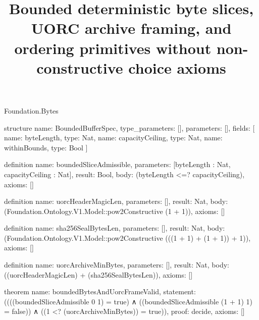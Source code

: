 \begin{lexlean}{Foundation.Bytes}
\title{Bounded deterministic byte slices, UORC archive framing, and ordering primitives without non-constructive choice axioms}

\begin{semanticmodule}

structure{
  name: BoundedBufferSpec,
  type_parameters: [],
  parameters: [],
  fields: [
    {name: byteLength, type: Nat},
    {name: capacityCeiling, type: Nat},
    {name: withinBounds, type: Bool}
  ]
}

definition{
  name: boundedSliceAdmissible,
  parameters: [byteLength : Nat, capacityCeiling : Nat],
  result: Bool,
  body: (byteLength <=? capacityCeiling),
  axioms: []
}

definition{
  name: uorcHeaderMagicLen,
  parameters: [],
  result: Nat,
  body: (Foundation.Ontology.V1.Model::pow2Constructive (1 + 1)),
  axioms: []
}

definition{
  name: sha256SealBytesLen,
  parameters: [],
  result: Nat,
  body: (Foundation.Ontology.V1.Model::pow2Constructive (((1 + 1) + (1 + 1)) + 1)),
  axioms: []
}

definition{
  name: uorcArchiveMinBytes,
  parameters: [],
  result: Nat,
  body: ((uorcHeaderMagicLen) + (sha256SealBytesLen)),
  axioms: []
}

theorem{
  name: boundedBytesAndUorcFrameValid,
  statement: ((((boundedSliceAdmissible 0 1) = true)
    ∧ ((boundedSliceAdmissible (1 + 1) 1) = false))
    ∧ ((1 <? (uorcArchiveMinBytes)) = true)),
  proof: decide{},
  axioms: []
}

\end{semanticmodule}
\end{lexlean}
